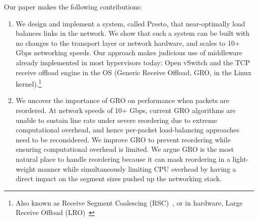 
\iffalse
Our paper makes the following contributions:
\begin{enumerate}

\item We design and implement a system, called Presto, that near-optimally load balances
links in the network. We show that such a system can be built with no changes to the transport
layer or network hardware, and scales to 10+ Gbps networking speeds.
Our approach makes judicious use of middleware
already implemented in most hypervisors today: Open vSwitch and the TCP receive offload engine in the OS
(Generic Receive Offload, GRO, in the Linux kernel).\footnote{Also known as Receive Segment Coalescing (RSC)~\cite{ms-rsc}, or in hardware, Large Receive Offload (LRO)~\cite{grossman2005large}} 

\item We uncover the importance of GRO on performance when packets are reordered.
At network speeds of 10+ Gbps, current GRO algorithms are unable to sustain line rate under 
severe reordering due to extreme computational overhead, and hence 
per-packet load-balancing approaches~\cite{drb,packetspray} need to be reconsidered. We
improve GRO to prevent reordering while ensuring computational overhead is limited.
We argue
GRO is the most natural place to handle reordering because it can mask
reordering in a light-weight manner while simultaneously limiting CPU overhead by having a direct impact
on the segment sizes pushed up the networking stack.


\end{enumerate}
